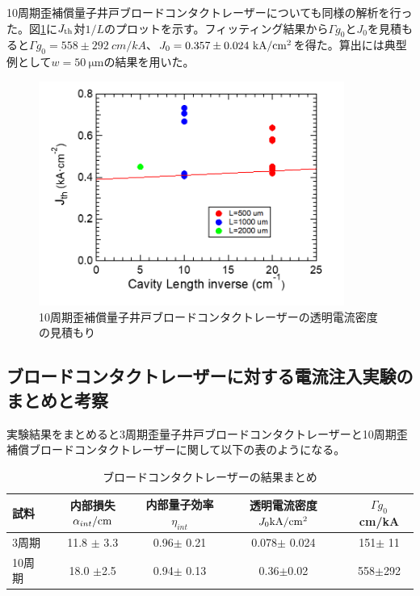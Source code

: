 {10周期歪補償量子井戸ブロードコンタクトレーザーについても同様の解析を行った。図\ref{fig:fig_3_1_10QW_broadcontact_j0}に$J_{\rm{th}}$対$1/L$のプロットを示す。フィッティング結果から$\Gamma g_{0}$と$J_{0}$を見積もると$\Gamma g_{0}=558  \pm 292\  \si{cm/kA}$、$J_{0}=0.357 \pm 0.024\  \rm{kA/cm^{2}}$を得た。算出には典型例として$w=50\ \si{\micro\metre}$の結果を用いた。
\begin{figure}[t]
	\centering
	\includegraphics[width=10cm]{figure/fig_3_1_10QW_broadcontact_j0.png}
	\caption{10周期歪補償量子井戸ブロードコンタクトレーザーの透明電流密度の見積もり}
	\label{fig:fig_3_1_10QW_broadcontact_j0}
\end{figure}
\newpage
\subsection{ブロードコンタクトレーザーに対する電流注入実験のまとめと考察}

実験結果をまとめると3周期歪量子井戸ブロードコンタクトレーザーと10周期歪補償ブロードコンタクトレーザーに関して以下の表のようになる。
\begin{table}[h]
  \caption{ブロードコンタクトレーザーの結果まとめ}
  \label{table:table_I0}
  \centering
  \begin{tabular}{lcccc}
    \hline
    試料   &  内部損失$\alpha_{int} \rm{ /cm}$&内部量子効率$\eta_{int} $&透明電流密度 $J_{0} \rm{  kA/cm^2}$  &$\Gamma g_{0}$ cm/kA\\
    \hline \hline
     3周期 &   11.8 $\pm$ 3.3 &0.96$\pm$ 0.21&0.078$\pm$  0.024& 151$\pm$ 11\\
    10周期 & 18.0 $\pm$2.5&0.94$\pm$ 0.13&0.36$\pm$0.02&558$\pm$292\\
    \hline
  \end{tabular}
\end{table}

}
